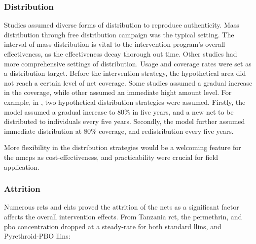 \documentclass[a4paper, 12pt, twoside]{report}
\begin{document}
%

\subsubsection{Distribution}%
\label{sub:distribution}
Studies assumed diverse forms of distribution to reproduce authenticity.
Mass distribution through free distribution campaign was the typical setting.
The interval of mass distribution is vital to the intervention program's overall effectiveness, as the effectiveness decay thorough out time.
Other studies had more comprehensive settings of distribution.
Usage and coverage rates were set as a distribution target.
Before the intervention strategy, the hypothetical area did not reach a certain level of net coverage.
Some studies assumed a gradual increase in the coverage, while other assumed an immediate hight amount level.
For example, in \cite{Griffin2010}, two hypothetical distribution strategies were assumed.
Firstly, the model assumed a gradual increase to 80\% in five years, and a new net to be distributed to individuals every five years.
Secondly, the model further assumed immediate distribution at 80\% coverage, and redistribution every five years.

More flexibility in the distribution strategies would be a welcoming feature for the \gls{nmcp}s as cost-effectiveness, and practicability were crucial for field application.

\subsubsection{Attrition}
\label{subsub:attrition}
Numerous \gls{rct}s and \gls{eht}s proved the attrition of the nets as a significant factor affects the overall intervention effects.
From Tanzania\cite{Protopopoff2018} \gls{rct}, the permethrin, and \gls{pbo} concentration dropped at a steady-rate for both standard \gls{llins}, and Pyrethroid-PBO \gls{llins}:
\end{document}
